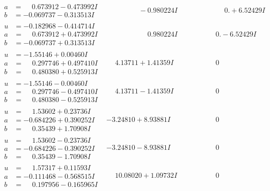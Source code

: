 \documentclass[1p]{elsarticle_modified}
\theoremstyle{definition}
\begin{document}
$$\begin{array}{c|c|c}
\begin{aligned}
a &= \phantom{-}0.673912 - 0.473992 I \\
b &= -0.069737 - 0.313513 I\end{aligned}
 & \phantom{-0.000000 } -0.980224 I & \phantom{-0.000000 -}0. + 6.52429 I \\ \hline\begin{aligned}
u &= -0.182968 - 0.414714 I \\
a &= \phantom{-}0.673912 + 0.473992 I \\
b &= -0.069737 + 0.313513 I\end{aligned}
 & \phantom{-0.000000 -}0.980224 I & \phantom{-0.000000 } 0. - 6.52429 I \\ \hline\begin{aligned}
u &= -1.55146 + 0.00460 I \\
a &= \phantom{-}0.297746 + 0.497410 I \\
b &= \phantom{-}0.480380 + 0.525913 I\end{aligned}
 & \phantom{-}4.13711 + 1.41359 I & \phantom{-0.000000 } 0 \\ \hline\begin{aligned}
u &= -1.55146 - 0.00460 I \\
a &= \phantom{-}0.297746 - 0.497410 I \\
b &= \phantom{-}0.480380 - 0.525913 I\end{aligned}
 & \phantom{-}4.13711 - 1.41359 I & \phantom{-0.000000 } 0 \\ \hline\begin{aligned}
u &= \phantom{-}1.53602 + 0.23736 I \\
a &= -0.684226 + 0.390252 I \\
b &= \phantom{-}0.35439 + 1.70908 I\end{aligned}
 & -3.24810 + 8.93881 I & \phantom{-0.000000 } 0 \\ \hline\begin{aligned}
u &= \phantom{-}1.53602 - 0.23736 I \\
a &= -0.684226 - 0.390252 I \\
b &= \phantom{-}0.35439 - 1.70908 I\end{aligned}
 & -3.24810 - 8.93881 I & \phantom{-0.000000 } 0 \\ \hline\begin{aligned}
u &= \phantom{-}1.57317 + 0.11593 I \\
a &= -0.111468 - 0.568515 I \\
b &= \phantom{-}0.197956 - 0.165965 I\end{aligned}
 & \phantom{-}10.08020 + 1.09732 I & \phantom{-0.000000 } 0 \\ \hline\begin{aligned}

\end{aligned}
\end{array}$$
\end{document}
